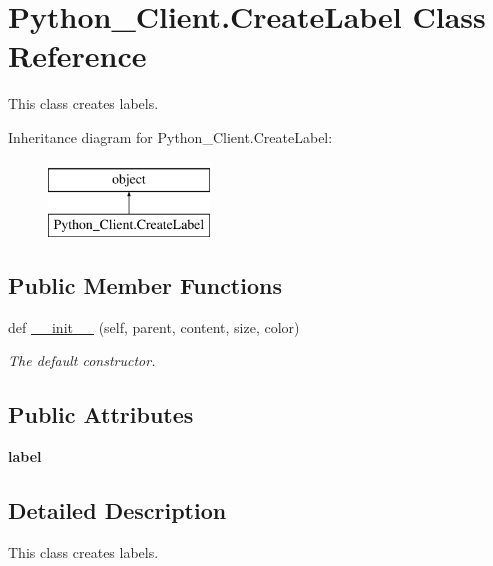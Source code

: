\hypertarget{class_python___client_1_1_create_label}{}\section{Python\+\_\+\+Client.\+Create\+Label Class Reference}
\label{class_python___client_1_1_create_label}


This class creates labels.  


Inheritance diagram for Python\+\_\+\+Client.\+Create\+Label\+:\begin{figure}[H]
\begin{center}
\leavevmode
\includegraphics[height=2.000000cm]{class_python___client_1_1_create_label}
\end{center}
\end{figure}
\subsection*{Public Member Functions}
\begin{DoxyCompactItemize}
\item 
def \mbox{\hyperlink{class_python___client_1_1_create_label_a55df86d9d18bfc00d79dfb0e35fc1377}{\+\_\+\+\_\+init\+\_\+\+\_\+}} (self, parent, content, size, color)
\begin{DoxyCompactList}\small\item\em The default constructor. \end{DoxyCompactList}\end{DoxyCompactItemize}
\subsection*{Public Attributes}
\begin{DoxyCompactItemize}
\item 
\mbox{\label{class_python___client_1_1_create_label_a39fd4147b815ba59bacf9d5d27ae9426}} 
{\bfseries label}
\end{DoxyCompactItemize}


\subsection{Detailed Description}
This class creates labels. 


